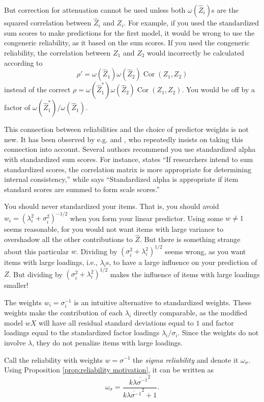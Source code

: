 \documentclass[twoside]{article}
\DeclareMathOperator{\Cor}{Cor}
\begin{document}
But correction for attenuation cannot be used unless both $\omega(\hat{Z}_i)$s are the squared correlation between $\hat{Z}_i$ and $Z_i$. For example, if you used the standardized sum scores to make predictions for the first model, it would be wrong to use the congeneric reliability, as it based on the sum scores. If you used the congeneric reliability, the correlation between $Z_1$ and $Z_2$ would incorrectly be calculated according to $$\rho'=\omega(\hat{Z}_{1})\omega(\hat{Z}_{2})\Cor(Z_{1},Z_{2})$$
instead of the correct $\rho=\omega(\hat{Z}_{1}^{*})\omega(\hat{Z}_{2})\Cor(Z_{1},Z_{2})$.
You would be off by a factor of $\omega(\hat{Z}_{1}^{*})/\omega(\hat{Z}_{1})$.

This connection between reliabilities and the choice of predictor
weights is not new. It has been observed by e.g. \citet[][p. 112]{Joreskog1971-nn} and \citet{McNeish2018-vu}, who repeatedly insists on taking this connection into account. Several authors recommend you use standardized alpha with standardized sum scores. For instance, \citet[][p. 451]{Falk2011-ae} states \enquote{If researchers intend to sum
standardized scores, the correlation matrix is more appropriate for determining internal consistency,} while \citet[][p. 99]{Cortina1993-aq} says \enquote{Standardized alpha is appropriate if item standard scores are summed to form scale scores.}

You should never standardized your items. That is, you should avoid $w_{i}=(\lambda_{i}^{2}+\sigma_{i}^{2})^{-1/2}$ when you form your linear predictor.
Using some $w\ne1$ seems reasonable, for you would not want items
with large variance to overshadow all the other contributions to $\hat{Z}$.
But there is something strange about this particular $w$. Dividing by $(\sigma_{i}^{2}+\lambda_{i}^{2})^{1/2}$
seems wrong, as you want items with large loadings, i.e., $\lambda_{i}$s, to have a large
influence on your prediction of $Z$. But dividing by $(\sigma_{i}^{2}+\lambda_{i}^{2})^{1/2}$
makes the influence of items with large loadings smaller!

The weights $w_i=\sigma_{i}^{-1}$ is an intuitive alternative to standardized weights. These weights make the contribution of each $\lambda_i$ directly comparable, as the modified model $wX$ will have all residual standard deviations equal to $1$ and factor loadings equal to the standardized factor loadings $\lambda_i/\sigma_i$. Since the weights do not involve $\lambda$, they do not penalize items with large loadings. 

Call the reliability with weights $w=\sigma^{-1}$ the \textit{sigma reliability} and denote it $\omega_\sigma$. Using Proposition \ref{prop:reliability motivation}, it can be written as
\begin{equation}
\omega_\sigma=\frac{k\overline{\lambda\sigma^{-1}}^{2}}{k\overline{\lambda\sigma^{-1}}^{2}+1}.\label{eq:Sigma-standardized reliability}
\end{equation}
\end{document}
